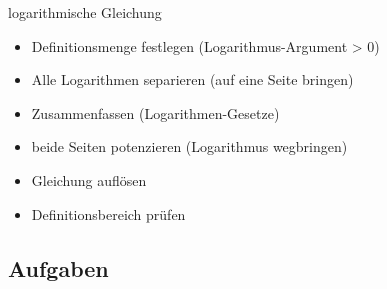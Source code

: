 \newpage
\begin{rezept}{logarithmische Gleichung}{}
  \begin{itemize}
  \item Definitionsmenge festlegen (Logarithmus-Argument > 0)
  \item Alle Logarithmen separieren (auf eine Seite bringen)
  \item Zusammenfassen (Logarithmen-Gesetze)
  \item beide Seiten potenzieren (Logarithmus wegbringen)
  \item Gleichung auflösen
  \item Definitionsbereich prüfen
 \end{itemize}
\end{rezept}

\subsection*{Aufgaben}
